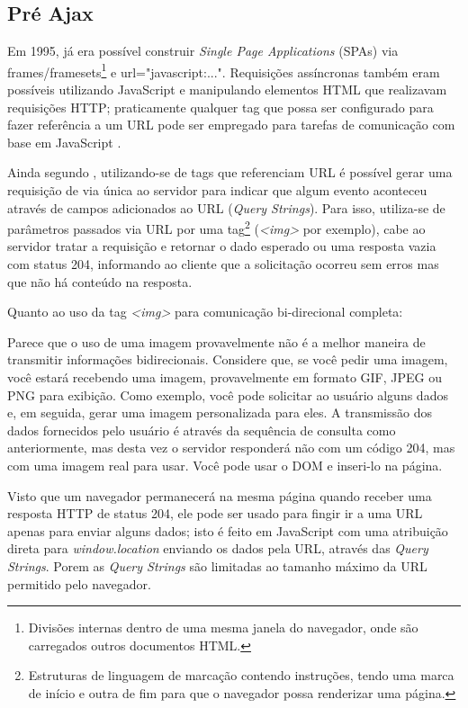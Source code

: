 \subsection{Pré Ajax}

Em 1995, já era possível construir \emph{Single Page Applications} (SPAs) via frames/framesets\footnote{Divisões internas dentro de uma mesma janela do navegador, onde são carregados outros documentos HTML.} e url="javascript:...". Requisições assíncronas também eram possíveis utilizando JavaScript e manipulando elementos HTML que realizavam requisições HTTP; praticamente qualquer tag que possa ser configurado para fazer referência a um URL pode ser empregado para tarefas de comunicação com base em JavaScript \cite{powell2008ajax}.

Ainda segundo , utilizando-se de tags que referenciam URL é possível gerar uma requisição de via única ao servidor para indicar que algum evento aconteceu através de campos adicionados ao URL (\emph{Query Strings}). Para isso, utiliza-se de parâmetros passados via URL por uma tag\footnote{Estruturas de linguagem de marcação contendo instruções, tendo uma marca de início e outra de fim para que o navegador possa renderizar uma página.} (\emph{<img>} por exemplo), cabe ao servidor tratar a requisição e retornar o dado esperado ou uma resposta vazia com status 204, informando ao cliente que a solicitação ocorreu sem erros mas que não há conteúdo na resposta.

Quanto ao uso da tag \emph{<img>} para comunicação bi-direcional  completa:

\begin{citacao}
	Parece que o uso de uma imagem provavelmente não é a melhor maneira de transmitir informações bidirecionais. Considere que, se você pedir uma imagem, você estará recebendo uma imagem, provavelmente em formato GIF, JPEG ou PNG para exibição. Como exemplo, você pode solicitar ao usuário alguns dados e, em seguida, gerar uma imagem personalizada para eles. A transmissão dos dados fornecidos pelo usuário é através da sequência de consulta como anteriormente, mas desta vez o servidor responderá não com um código 204, mas com uma imagem real para usar. Você pode usar o DOM e inseri-lo na página.
\end{citacao}

Visto que um navegador permanecerá na mesma página quando receber uma resposta HTTP de status 204, ele pode ser usado para fingir ir a uma URL apenas para enviar alguns dados; isto é feito em JavaScript com uma atribuição direta para \emph{window.location} enviando os dados pela URL, através das \emph{Query Strings}. Porem as \emph{Query Strings} são limitadas ao tamanho máximo da URL permitido pelo navegador.

